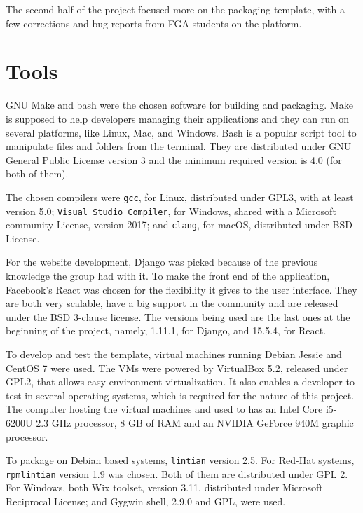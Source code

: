 The second half of the project focused more on the packaging template, with a few corrections and bug reports from FGA students on the platform.


\section{Tools}
\label{sec:tools}

GNU Make and bash were the chosen software for building and packaging. Make is supposed to help developers managing their applications and they can run on several platforms, like Linux, Mac, and Windows. Bash is a popular script tool to manipulate files and folders from the terminal. They are distributed under GNU General Public License version 3 and the minimum required version is 4.0 (for both of them).

The chosen compilers were \texttt{gcc}, for Linux, distributed under GPL3, with at least version 5.0; \texttt{Visual Studio Compiler}, for Windows, shared with a Microsoft community License, version 2017; and \texttt{clang}, for macOS, distributed under BSD License.

For the website development, Django was picked because of the previous knowledge the group had with it. To make the front end of the application, Facebook's React was chosen for the flexibility it gives to the user interface. They are both very scalable, have a big support in the community and are released under the BSD 3-clause license. The versions being used are the last ones at the beginning of the project, namely, 1.11.1, for Django, and 15.5.4, for React.

To develop and test the template, virtual machines running Debian Jessie and CentOS 7 were used. The VMs were powered by VirtualBox 5.2, released under GPL2, that allows easy environment virtualization. It also enables a developer to test in several operating systems, which is required for the nature of this project. The computer hosting the virtual machines and used to has an Intel Core i5-6200U 2.3 GHz processor, 8 GB of RAM and an NVIDIA GeForce 940M graphic processor.

To package on Debian based systems, \texttt{lintian} version 2.5. For Red-Hat systems, \texttt{rpmlintian} version 1.9 was chosen. Both of them are distributed under GPL 2. For Windows, both Wix toolset, version 3.11, distributed under Microsoft Reciprocal License; and Gygwin shell, 2.9.0 and GPL, were used.
